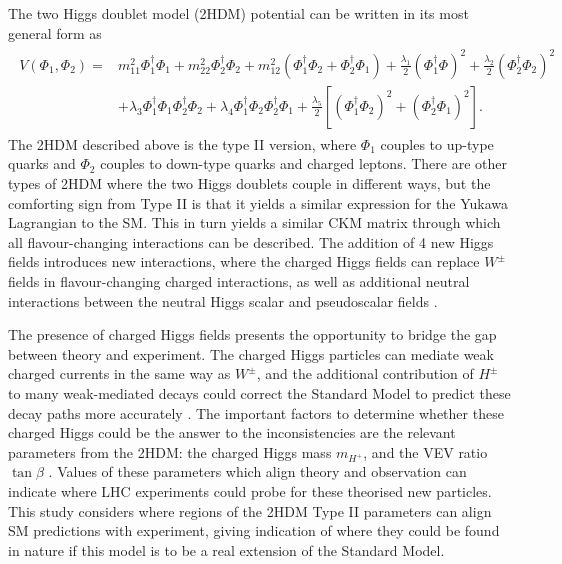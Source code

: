 \documentclass[a4paper,12pt]{article}
\begin{document}
The two Higgs doublet model (2HDM) potential can be written in its most general form as
\begin{align}
    \label{eq:HDMpot}
    \begin{split}
        V(\Phi_1,\Phi_2) =& m_{11}^2\Phi_1^\dagger\Phi_1 + m_{22}^2\Phi_2^\dagger\Phi_2 + m_{12}^2(\Phi_1^\dagger\Phi_2+\Phi_2^\dagger\Phi_1) + \frac{\lambda_1}{2}(\Phi_1^\dagger\Phi)^2 + \frac{\lambda_2}{2}(\Phi_2^\dagger\Phi_2)^2 \\
                                                        &+ \lambda_3\Phi_1^\dagger\Phi_1\Phi_2^\dagger\Phi_2 + \lambda_4\Phi_1^\dagger\Phi_2\Phi_2^\dagger\Phi_1 + \frac{\lambda_5}{2}\left[(\Phi_1^\dagger\Phi_2)^2+(\Phi_2^\dagger\Phi_1)^2\right].
    \end{split}
\end{align}
The 2HDM described above is the type II version, where $\Phi_1$ couples to up-type quarks and $\Phi_2$ couples to down-type quarks and charged leptons. 
There are other types of 2HDM where the two Higgs doublets couple in different ways, but the comforting sign from Type II is that it yields a similar expression for the Yukawa Lagrangian to the SM. 
This in turn yields a similar CKM matrix through which all flavour-changing interactions can be described. 
The addition of 4 new Higgs fields introduces new interactions, where the charged Higgs fields can replace $W^\pm$ fields in flavour-changing charged interactions, as well as additional neutral interactions between the neutral Higgs scalar and pseudoscalar fields \cite{branco}. 

The presence of charged Higgs fields presents the opportunity to bridge the gap between theory and experiment. 
The charged Higgs particles can mediate weak charged currents in the same way as $W^{\pm}$, and the additional contribution of $H^{\pm}$ to many weak-mediated decays could correct the Standard Model to predict these decay paths more accurately \cite{branco}. 
The important factors to determine whether these charged Higgs could be the answer to the inconsistencies are the relevant parameters from the 2HDM: the charged Higgs mass $m_{H^+}$, and the VEV ratio $\tan\beta$ \cite{desc}. 
Values of these parameters which align theory and observation can indicate where LHC experiments could probe for these theorised new particles. 
This study considers where regions of the 2HDM Type II parameters can align SM predictions with experiment, giving indication of where they could be found in nature if this model is to be a real extension of the Standard Model.
\end{document}
